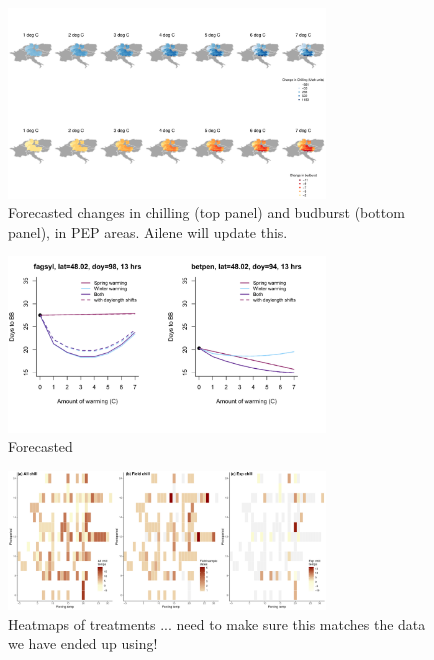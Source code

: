 \documentclass{article}
\begin{document}
\begin{figure}[h!]
\centering
\noindent \includegraphics[width=0.75\textwidth]{..//..//analyses/bb_analysis/figures/forecasting/heatmap_betpen_forecastbbchill.pdf}
\caption{Forecasted changes in chilling (top panel) and budburst (bottom panel), in PEP areas. Ailene will update this. }
\label{fig:foremap}
\end{figure}
\begin{figure}[h!]
\centering
\noindent \includegraphics[width=0.75\textwidth]{..//..//analyses/bb_analysis/figures/forecasting/tempforecast_bothspp_PEPBB_wdl_utah.pdf}
\caption{Forecasted }
\label{fig:foremap}
\end{figure}


\newpage
\begin{figure}[h!]
\centering
\noindent \includegraphics[width=0.75\textwidth]{..//..//analyses/bb_analysis/figures/studydesign_heat3panel.pdf}
\caption{Heatmaps of treatments ... need to make sure this matches the data we have ended up using!}
\label{fig:treatheatmaps} %
\end{figure}
\end{document}
